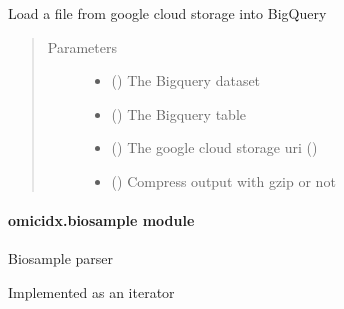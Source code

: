 \documentclass[letterpaper,10pt,english]{sphinxmanual}
\begin{document}
\begin{fulllineitems}
\label{\detokenize{omicidx.bigquery_utils:omicidx.bigquery_utils.table_to_gcs}}
Load a file from google cloud storage into BigQuery
\begin{quote}\begin{description}
\item[{Parameters}] \leavevmode\begin{itemize}
\item {} 
 () \textendash{} The Bigquery dataset

\item {} 
 () \textendash{} The Bigquery table

\item {} 
 () \textendash{} The google cloud storage uri ()

\item {} 
 () \textendash{} Compress output with gzip or not

\end{itemize}

\end{description}\end{quote}

\end{fulllineitems}



\paragraph{omicidx.biosample module}
\label{\detokenize{omicidx.biosample:module-omicidx.biosample}}\label{\detokenize{omicidx.biosample:omicidx-biosample-module}}\label{\detokenize{omicidx.biosample::doc}}
Biosample parser

Implemented as an iterator
\end{document}
